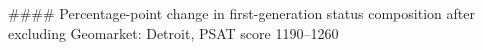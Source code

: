 #### Percentage-point change in first-generation status composition after excluding Geomarket: Detroit, PSAT score 1190–1260
